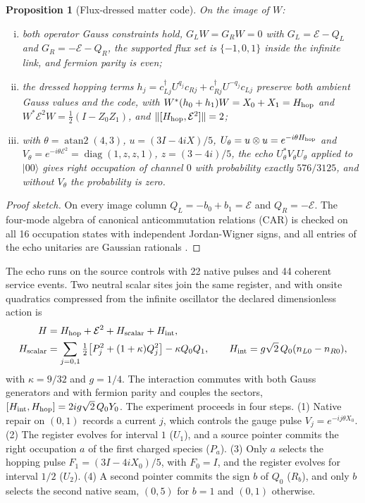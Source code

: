 \documentclass[11pt]{article}
\newtheorem{proposition}[theorem]{Proposition}
\theoremstyle{definition}
\theoremstyle{remark}
\theoremstyle{plain}
\newcommand{\ket}[1]{\lvert #1\rangle}
\newcommand{\Eflux}{\mathcal{E}}
\newcommand{\diag}{\operatorname{diag}}
\begin{document}
\begin{proposition}[Flux-dressed matter code]
\label{prop:gauss}
On the image of $W$:
\begin{enumerate}[(i)]
\item both operator Gauss constraints hold, $G_LW=G_RW=0$ with
$G_L=\Eflux-Q_L$ and $G_R=-\Eflux-Q_R$, the supported flux set is
$\{-1,0,1\}$ inside the infinite link, and fermion parity is even;
\item the dressed hopping terms $h_j=c_{Lj}^\dagger U^{q_j}c_{Rj}+c_{Rj}^\dagger
U^{-q_j}c_{Lj}$ preserve both ambient Gauss values and the code, with
$W^*(h_0+h_1)W=X_0+X_1=H_{\rm hop}$ and
$W^*\Eflux^2W=\frac12(I-Z_0Z_1)$, and
$\lVert[H_{\rm hop},\Eflux^2]\rVert=2$;
\item with $\theta=\operatorname{atan2}(4,3)$, $u=(3I-4iX)/5$,
$U_\theta=u\otimes u=e^{-i\theta H_{\rm hop}}$ and
$V_\theta=e^{-i\theta\Eflux^2}=\diag(1,z,z,1)$, $z=(3-4i)/5$, the echo
$U_\theta^*V_\theta U_\theta$ applied to $\ket{00}$ gives right occupation of
channel $0$ with probability exactly $576/3125$, and without $V_\theta$ the
probability is zero.
\end{enumerate}
\end{proposition}

\begin{proof}[Proof sketch]
On every image column $Q_L=-b_0+b_1=\Eflux$ and $Q_R=-\Eflux$. The four-mode
algebra of canonical anticommutation relations (CAR) is checked on all 16
occupation states with independent Jordan-Wigner signs, and all entries of
the echo unitaries are Gaussian rationals \cite{csDERIV}.
\end{proof}

The echo runs on the source controls with 22 native pulses and 44 coherent
service events. Two neutral scalar sites join the same register, and with
onsite quadratics compressed from the infinite oscillator the declared
dimensionless action is
\begin{equation}
\label{eq:common-H}
\begin{aligned}
H&=H_{\rm hop}+\Eflux^2+H_{\rm scalar}+H_{\rm int},\\
H_{\rm scalar}&=\sum_{j=0,1}\tfrac12\bigl[P_j^2+(1+\kappa)Q_j^2\bigr]-\kappa Q_0Q_1,
\qquad H_{\rm int}=g\sqrt2\,Q_0(n_{L0}-n_{R0}),
\end{aligned}
\end{equation}
with $\kappa=9/32$ and $g=1/4$. The interaction commutes with both Gauss
generators and with fermion parity and couples the sectors,
$[H_{\rm int},H_{\rm hop}]=2ig\sqrt2\,Q_0Y_0$. The experiment proceeds in four
steps. (1) Native repair on $(0,1)$ records a current $j$, which controls the
gauge pulse $V_j=e^{-ij\theta X_0}$. (2) The register evolves for interval
$1$ ($U_1$), and a source pointer commits the right occupation $a$ of the
first charged species ($P_a$). (3) Only $a$ selects the hopping pulse
$F_1=(3I-4iX_0)/5$, with $F_0=I$, and the register evolves for interval $1/2$
($U_2$). (4) A second pointer commits the sign $b$ of $Q_0$ ($R_b$), and only
$b$ selects the second native seam, $(0,5)$ for $b=1$ and $(0,1)$ otherwise.
\end{document}
